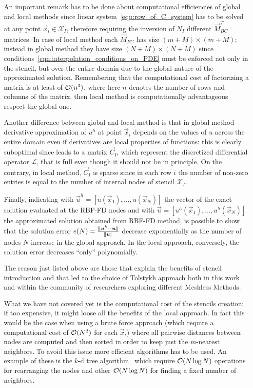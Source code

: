 \bigskip
An important remark has to be done about computational efficiencies of global and local methods since linear system~\eqref{eqn:row_of_C_system} has to be solved at any point $\vec{x}_i \in \mathcal{X}_I$, therefore requiring the inversion of $N_I$ different $\vec{M}_{BC}^T$ matrices. In case of local method each $\vec{M}_{BC}$ has size $(m+M) \times (m+M)$; instead in global method they have size $(N+M) \times (N+M)$ since conditions~\eqref{eqn:interpolation_conditions_on_PDE} must be enforced not only in the stencil, but over the entire domain due to the global nature of the approximated solution. Remembering that the computational cost of factorizing a matrix is at least of $\mathcal{O}(n^3)$, where here $n$ denotes the number of rows and columns of the matrix, then local method is computationally advantageous respect the global one.

Another difference between global and local method is that in global method derivative approximation of $u^h$ at point $\vec{x}_i$ depends on the values of $u$ across the entire domain even if derivatives are local properties of functions: this is clearly suboptimal since leads to a matrix $\vec{C}_I$, which represent the discretized differential operator $\mathcal{L}$, that is full even though it should not be in principle. On the contrary, in local method, $\vec{C}_I$ is sparse since in each row $i$ the number of non-zero entries is equal to the number of internal nodes of stencil $\mathcal{X}_I$.

Finally, indicating with $\vec{u}^h = \left[u(\vec{x}_1), \dots, u(\vec{x}_N)\right]$ the vector of the exact solution evaluated at the RBF-FD nodes and with $\vec{u} = \left[u^h(\vec{x}_1), \dots, u^h(\vec{x}_N)\right]$ the approximated solution obtained from RBF-FD method, is possible to show that the solution error $e(N) = \frac{\lVert\boldsymbol{u}^h - \boldsymbol{u}\rVert}{\lVert\boldsymbol{u}\rVert}$ decrease exponentially as the number of nodes $N$ increase in the global approach. In the local approach, conversely, the solution error decreases ``only'' polynomially.

The reason just listed above are those that explain the benefits of stencil introduction and that led to the choice of Tolstykh approach both in this work and within the community of researchers exploring different Meshless Methods.

\bigskip
What we have not covered yet is the computational cost of the stencils creation: if too expensive, it might loose all the benefits of the local approach. In fact this would be the case when using a brute force approach (which require a computational cost of $\mathcal{O}(N^2)$ for each $\vec{x}_i$) where all pairwise distances between nodes are computed and then sorted in order to keep just the $m$-nearest neighbors. To avoid this issue more efficient algorithms has to be used. An example of these is the $k$-d tree algorithm~\cite{Bentley:k-d_tree} which require $\mathcal{O}(N \log N)$ operations for rearranging the nodes and other $\mathcal{O}(N \log N)$ for finding a fixed number of neighbors.

